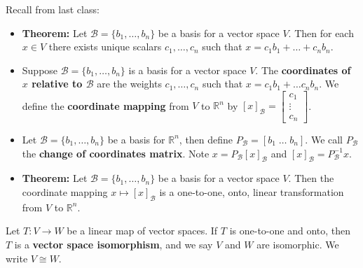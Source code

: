 \documentclass[12pt,letterpaper]{article}
\begin{document}
\thispagestyle{fancy}

Recall from last class:

\begin{itemize}
\item {\bf Theorem:} Let $\mathcal{B} =\{b_1, \dots, b_n\}$ be a basis for a  vector space $V$. Then for each $x \in V$ there exists unique scalars $c_1,\dots, c_n$ such that $x=c_1 b_1+\dots+ c_n b_n$.
\item Suppose $\mathcal{B}=\{b_1, \dots, b_n\}$ is a basis for a vector space $V$. The {\bf coordinates of $x$ relative to $\mathcal{B}$} are the weights $c_1, \dots, c_n$ such that $x=c_1 b_1 +\dots c_n b_n$. We define the {\bf coordinate mapping} from $V$ to $\mathbb{R}^n$ by $[x]_\mathcal{B}=\begin{bmatrix} c_1\\ \vdots\\ c_n \end{bmatrix}$.
\item Let $\mathcal{B}=\{b_1, \dots, b_n\}$ be a basis for $\mathbb{R}^n$, then define $P_\mathcal{B}=[b_1 \; \dots \; b_n]$. We call $P_\mathcal{B}$ the {\bf change of coordinates matrix}. Note $x = P_\mathcal{B} [x]_{\mathcal{B}}$ and $[x]_\mathcal{B}=P_{\mathcal{B}}^{-1} x.$
\item {\bf Theorem:} Let $\mathcal{B}=\{ b_1, \dots, b_n\}$ be a basis for a vector space $V$. Then the coordinate mapping $x \mapsto [x]_\mathcal{B}$ is a one-to-one, onto, linear transformation from $V$ to $\mathbb{R}^n$.
\end{itemize}

\newpage

\begin{defn}
	Let $T: V \to W$ be a linear map of vector spaces. If $T$ is one-to-one and onto, then $T$ is a {\bf vector space isomorphism}, and we say $V$ and $W$ are isomorphic. We write $V \cong W$.
\end{defn}
\end{document}
